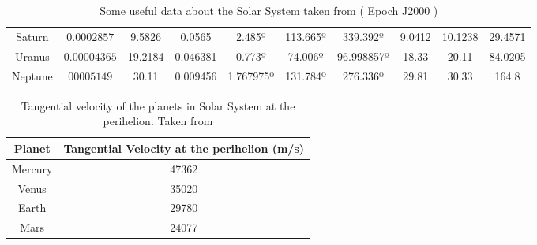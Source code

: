 \begin{table}
\begin{tabular}{| c | c | c | c |c | c | c | c | c | c |}
Saturn	\cite{SaturnData}&$0.0002857$&	9.5826 & 0.0565 & 2.485º & 113.665º & 339.392º & 9.0412 & 10.1238 & 29.4571 \\
Uranus \cite{UranusData}& $0.00004365$& 19.2184 & 0.046381 & 0.773º &	74.006º & 96.998857º & 18.33 & 20.11 & 84.0205 \\
Neptune \cite{NeptuneData}&$00005149$&	30.11 & 0.009456 & 1.767975º & 131.784º & 276.336º & 29.81 & 30.33 & 164.8 \\
\hline
\end{tabular}
\caption{Some useful data about the Solar System taken from \cite{MercuryData, VenusData, EarthData, MarsData, JupiterData, SaturnData, UranusData, NeptuneData} ( Epoch J2000 )}
\label{tab:SolarSystemData}
\end{table}

\begin{table}[h]
\centering
\begin{tabular}{|c|c|}
\hline
Planet & Tangential Velocity at the perihelion (m/s)\\
\hline
Mercury & 47362 \\
Venus & 35020 \\
Earth & 29780 \\
Mars & 24077 \\
\hline
\end{tabular}
\caption{Tangential velocity of the planets in Solar System at the perihelion. Taken from \cite{MercuryData, VenusData, EarthData, MarsData, JupiterData, SaturnData, UranusData, NeptuneData}}
\label{tab:SolarSystemTangVelocityData}
\end{table}


